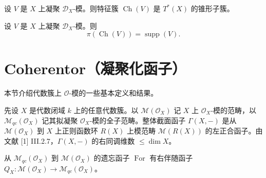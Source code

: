 \begin{proposition}
设 $V$ 是 $X$ 上凝聚 $\mathcal{D}_X$-模。则特征簇 $\operatorname{Ch}(V)$ 是 $T^*(X)$ 的锥形子簇。
\end{proposition}

\begin{theorem}
设 $V$ 是 $X$ 上凝聚 $\mathcal{D}_X$-模。则
$$\pi(\operatorname{Ch}(V))=\operatorname{supp}(V).$$
\end{theorem}

\section{Coherentor（凝聚化函子）}

本节介绍代数簇上 $\mathcal{O}$-模的一些基本定义和结果。

先设 $X$ 是代数闭域 $k$ 上的任意代数簇。以 $\mathcal{M}(\mathcal{O}_X)$ 记 $X$ 上 $\mathcal{O}_X$-模的范畴，以 $\mathcal{M}_{qc}(\mathcal{O}_X)$ 记其拟凝聚 $\mathcal{O}_X$-模的全子范畴。整体截面函子 $\Gamma(X,-)$ 是从 $\mathcal{M}(\mathcal{O}_X)$ 到 $X$ 上正则函数环 $R(X)$ 上模范畴 $\mathcal{M}(R(X))$ 的左正合函子。由文献 [1] III.2.7，$\Gamma(X,-)$ 的右同调维数 $\le\dim X$。

\begin{lemma}
从 $\mathcal{M}_{qc}(\mathcal{O}_X)$ 到 $\mathcal{M}(\mathcal{O}_X)$ 的遗忘函子 $\operatorname{For}$ 有右伴随函子 $Q_X:\mathcal{M}(\mathcal{O}_X)\to\mathcal{M}_{qc}(\mathcal{O}_X)$。
\end{lemma}


